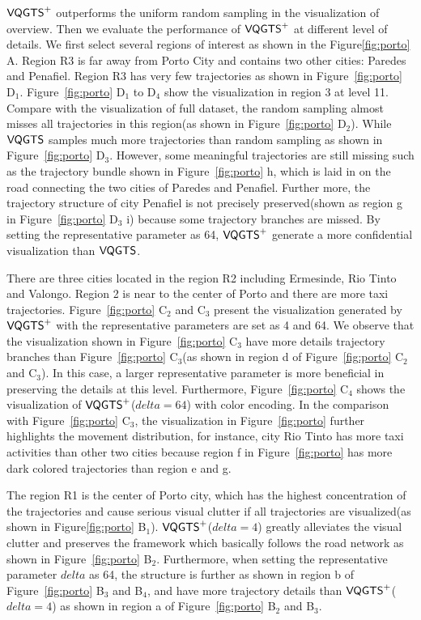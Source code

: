 $\mathsf{VQGTS}^{+}$ outperforms the uniform random sampling in the visualization of overview. Then we evaluate the performance of $\mathsf{VQGTS}^{+}$ at different level of details. We first select several regions of interest as shown in the Figure\ref{fig:porto} A. 
Region R3 is far away from Porto City and contains two other cities: Paredes and Penafiel. Region R3 has very few trajectories as shown in Figure~\ref{fig:porto} D$_1$. Figure~\ref{fig:porto} D$_1$ to D$_4$ show the visualization in region 3 at level 11.  Compare with the visualization of full dataset, the random sampling almost misses all trajectories in this region(as shown in Figure~\ref{fig:porto} D$_2$). While $\mathsf{VQGTS}$ samples much more trajectories than random sampling as shown in Figure~\ref{fig:porto} D$_3$. However, some meaningful trajectories are still missing such as the trajectory bundle shown in Figure~\ref{fig:porto} h, which is laid in on the road  connecting the two cities of Paredes and Penafiel. Further more, the trajectory structure of city Penafiel is not precisely preserved(shown as region g in Figure~\ref{fig:porto} D$_3$ i) because some  trajectory branches are missed.  
By setting the representative parameter as 64, $\mathsf{VQGTS}^{+}$ generate a more confidential visualization than $\mathsf{VQGTS}$. 

There are three cities located in the region R2 including Ermesinde, Rio Tinto and Valongo. Region 2 is near to the center of Porto and there are more taxi trajectories. 
Figure~\ref{fig:porto} C$_2$ and C$_3$ present the visualization generated by $\mathsf{VQGTS}^{+}$ with the representative parameters are set as 4 and 64. We observe that the visualization shown in Figure~\ref{fig:porto} C$_3$ have more details trajectory branches than Figure~\ref{fig:porto} C$_3$(as shown in region d of Figure~\ref{fig:porto} C$_2$ and C$_3$). In this case, a larger representative parameter is more beneficial in preserving the details at this level. Furthermore, Figure~\ref{fig:porto} C$_4$ shows the visualization of $\mathsf{VQGTS}^{+}$($delta = 64$) with color encoding. In the comparison with Figure~\ref{fig:porto} C$_3$, the visualization in Figure~\ref{fig:porto} further highlights the movement distribution, for instance, city Rio Tinto has more taxi activities than other two cities because region f in Figure~\ref{fig:porto} has more dark colored trajectories than region e and g.

The region R1 is the center of Porto city, which has the highest concentration of the trajectories and cause serious visual clutter if all trajectories are visualized(as shown in Figure\ref{fig:porto} B$_1$). $\mathsf{VQGTS}^{+}$($delta = 4$) greatly alleviates the visual clutter and preserves the framework which basically follows the road network as shown in Figure~\ref{fig:porto} B$_2$. Furthermore, when setting the representative parameter $delta$ as 64, the structure is further  as shown in region b of Figure~\ref{fig:porto} B$_3$ and B$_4$, and have more trajectory details than $\mathsf{VQGTS}^{+}$($delta = 4$) as shown in region a of Figure~\ref{fig:porto} B$_2$ and B$_3$.
 
